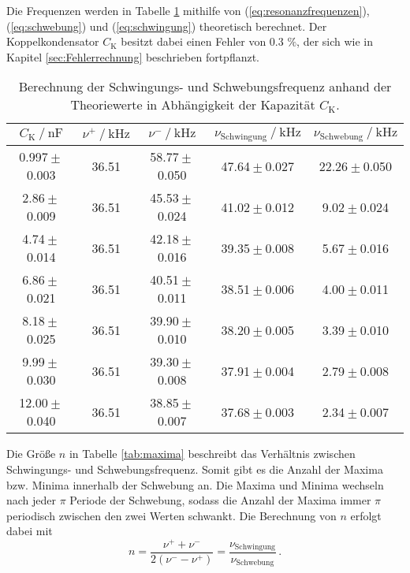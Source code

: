 Die Frequenzen werden in Tabelle \ref{tab:schwebung} mithilfe von (\ref{eq:resonanzfrequenzen}), 
(\ref{eq:schwebung}) und (\ref{eq:schwingung}) theoretisch berechnet. Der Koppelkondensator
$C_\text{K}$ besitzt dabei einen Fehler von 0.3 $\unit{\percent}$, der sich wie in Kapitel 
\ref{sec:Fehlerrechnung} beschrieben fortpflanzt.
\begin{table}
    \centering
    \caption{   Berechnung der Schwingungs- und Schwebungsfrequenz anhand der Theoriewerte
                in Abhängigkeit der Kapazität $C_\text{K}$. }
    \label{tab:schwebung}
    \begin{tabular}{c c c c c}
        \toprule
        ${C_\text{K}} \mathbin{/} \unit{\nano\farad}$ &
        $\nu^+ \mathbin{/} \unit{\kilo\hertz}$ &
        $\nu^- \mathbin{/} \unit{\kilo\hertz}$ &
        $\nu_\text{Schwingung} \mathbin{/} \unit{\kilo\hertz}$ &
        $\nu_\text{Schwebung} \mathbin{/} \unit{\kilo\hertz}$ \\
        \midrule
         0.997${}\pm{}$0.003 &    36.51 & 58.77${}\pm{}$0.050 &    47.64${}\pm{}$0.027 &   22.26${}\pm{}$0.050 \\
          2.86${}\pm{}$0.009 &    36.51 & 45.53${}\pm{}$0.024 &    41.02${}\pm{}$0.012 &    9.02${}\pm{}$0.024 \\
          4.74${}\pm{}$0.014 &    36.51 & 42.18${}\pm{}$0.016 &    39.35${}\pm{}$0.008 &    5.67${}\pm{}$0.016 \\
          6.86${}\pm{}$0.021 &    36.51 & 40.51${}\pm{}$0.011 &    38.51${}\pm{}$0.006 &    4.00${}\pm{}$0.011 \\
          8.18${}\pm{}$0.025 &    36.51 & 39.90${}\pm{}$0.010 &    38.20${}\pm{}$0.005 &    3.39${}\pm{}$0.010 \\
          9.99${}\pm{}$0.030 &    36.51 & 39.30${}\pm{}$0.008 &    37.91${}\pm{}$0.004 &    2.79${}\pm{}$0.008 \\
         12.00${}\pm{}$0.040 &    36.51 & 38.85${}\pm{}$0.007 &    37.68${}\pm{}$0.003 &    2.34${}\pm{}$0.007 \\
        \bottomrule
    \end{tabular}
\end{table}

Die Größe $n$ in Tabelle \ref{tab:maxima} beschreibt das Verhältnis zwischen Schwingungs- und 
Schwebungsfrequenz. Somit gibt es die Anzahl der Maxima bzw. Minima innerhalb der Schwebung an. 
Die Maxima und Minima wechseln nach jeder $\pi$ Periode der Schwebung, sodass die Anzahl der Maxima
immer $\pi$ periodisch zwischen den zwei Werten schwankt. Die Berechnung von $n$ erfolgt dabei mit
\begin{equation}
    n=\frac{\nu^+ + \nu^-}{2\left(\nu^- - \nu^+\right)}=\frac{\nu_{\text{Schwingung}}}{\nu_{\text{Schwebung}}} \, .
\end{equation}


